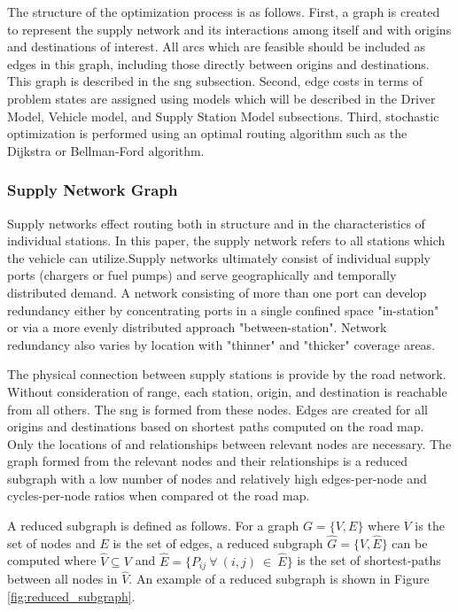 The structure of the optimization process is as follows. First, a graph is created to represent the supply network and its interactions among itself and with origins and destinations of interest. All arcs which are feasible should be included as edges in this graph, including those directly between origins and destinations. This graph is described in the \gls{sng} subsection. Second, edge costs in terms of problem states are assigned using models which will be described in the Driver Model, Vehicle model, and Supply Station Model subsections. Third, stochastic optimization is performed using an optimal routing algorithm such as the Dijkstra or Bellman-Ford algorithm.

\subsubsection*{Supply Network Graph}

Supply networks effect routing both in structure and in the characteristics of individual stations. In this paper, the supply network refers to all stations which the vehicle can utilize.Supply networks ultimately consist of individual supply ports (chargers or fuel pumps) and serve geographically and temporally distributed demand. A network consisting of more than one port can develop redundancy either by concentrating ports in a single confined space "in-station" or via a more evenly distributed approach "between-station". Network redundancy also varies by location with "thinner" and "thicker" coverage areas.

The physical connection between supply stations is provide by the road network. Without consideration of range, each station, origin, and destination is reachable from all others. The \gls{sng} is formed from these nodes. Edges are created for all origins and destinations based on shortest paths computed on the road map. Only the locations of and relationships between relevant nodes are necessary. The graph formed from the relevant nodes and their relationships is a reduced subgraph with a low number of nodes and relatively high edges-per-node and cycles-per-node ratios when compared ot the road map.

A reduced subgraph is defined as follows. For a graph $G = \{V, E\}$ where $V$ is the set of nodes and $E$ is the set of edges, a reduced subgraph $\hat{G} = \{\hat{V}, \hat{E}\}$ can be computed where $\hat{V} \subseteq V$ and $\hat{E} = \{P_{ij}\ \forall\ (i, j)\ \in\ \hat{E}\}$ is the set of shortest-paths between all nodes in $\hat{V}$. An example of a reduced subgraph is shown in Figure \ref{fig:reduced_subgraph}.

